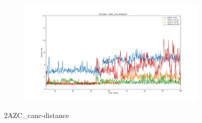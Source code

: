 \documentclass[fleqn,10pt]{wlscirep}
\begin{document}
\begin{figure}[!ht]
\begin{subfigure}{.45\textwidth}
   \end{subfigure}
    \begin{subfigure}{.45\textwidth}
     \centering
     \includegraphics[width=.95\linewidth]{2AZC_canc/2AZC_canc-dist_4.png}
   \end{subfigure}
\caption{2AZC_{canc}-distance}
\label{sup:2AZC_canc-dist}
\end{figure}  
\end{document}
